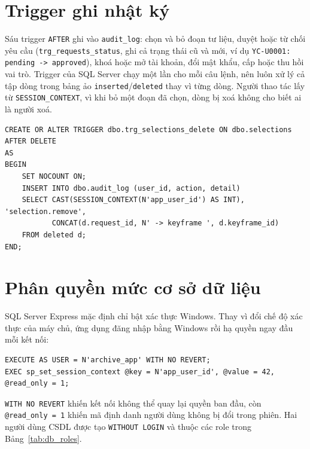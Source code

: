 \section{Trigger ghi nhật ký}

Sáu trigger \texttt{AFTER} ghi vào \texttt{audit\_log}: chọn và bỏ đoạn tư liệu, duyệt
hoặc từ chối yêu cầu (\texttt{trg\_requests\_status}, ghi cả trạng thái cũ và mới, ví dụ
\texttt{YC-U0001: pending -> approved}), khoá hoặc mở tài khoản, đổi mật khẩu, cấp hoặc thu
hồi vai trò. Trigger của SQL Server chạy một lần
cho mỗi câu lệnh, nên luôn xử lý cả tập dòng trong bảng ảo \texttt{inserted}/\texttt{deleted}
thay vì từng dòng. Người thao tác lấy từ \texttt{SESSION\_CONTEXT}, vì khi bỏ một đoạn đã chọn, dòng
bị xoá không cho biết ai là người xoá.

\begin{lstlisting}[caption={Trigger ghi nhật ký khi bỏ đoạn tư liệu đã chọn}, label={lst:trigger}]
CREATE OR ALTER TRIGGER dbo.trg_selections_delete ON dbo.selections
AFTER DELETE
AS
BEGIN
    SET NOCOUNT ON;
    INSERT INTO dbo.audit_log (user_id, action, detail)
    SELECT CAST(SESSION_CONTEXT(N'app_user_id') AS INT), 'selection.remove',
           CONCAT(d.request_id, N' -> keyframe ', d.keyframe_id)
    FROM deleted d;
END;
\end{lstlisting}

\section{Phân quyền mức cơ sở dữ liệu}

SQL Server Express mặc định chỉ bật xác thực Windows. Thay vì đổi chế độ xác thực của máy
chủ, ứng dụng đăng nhập bằng Windows rồi hạ quyền ngay đầu mỗi kết nối:

\begin{lstlisting}[caption={Mỗi kết nối của ứng dụng}, label={lst:execute_as}]
EXECUTE AS USER = N'archive_app' WITH NO REVERT;
EXEC sp_set_session_context @key = N'app_user_id', @value = 42, @read_only = 1;
\end{lstlisting}

\texttt{WITH NO REVERT} khiến kết nối không thể quay lại quyền ban đầu, còn
\texttt{@read\_only = 1} khiến mã định danh người dùng không bị đổi trong phiên. Hai người
dùng CSDL được tạo \texttt{WITHOUT LOGIN} và thuộc các role trong Bảng~\ref{tab:db_roles}.

